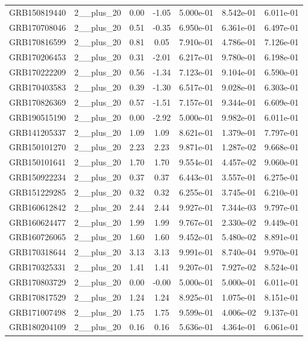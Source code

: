 \documentclass[12pt]{article}
\begin{document}
\begin{table}[h!]
{\begin{tabular}{l c c c c c c}
GRB150819440 & 2__plus_20 & 0.00 & -1.05 & 5.000e-01 & 8.542e-01 & 6.011e-01 \\
GRB170708046 & 2__plus_20 & 0.51 & -0.35 & 6.950e-01 & 6.361e-01 & 6.497e-01 \\
GRB170816599 & 2__plus_20 & 0.81 & 0.05 & 7.910e-01 & 4.786e-01 & 7.126e-01 \\
GRB170206453 & 2__plus_20 & 0.31 & -2.01 & 6.217e-01 & 9.780e-01 & 6.198e-01 \\
GRB170222209 & 2__plus_20 & 0.56 & -1.34 & 7.123e-01 & 9.104e-01 & 6.590e-01 \\
GRB170403583 & 2__plus_20 & 0.39 & -1.30 & 6.517e-01 & 9.028e-01 & 6.303e-01 \\
GRB170826369 & 2__plus_20 & 0.57 & -1.51 & 7.157e-01 & 9.344e-01 & 6.609e-01 \\
GRB190515190 & 2__plus_20 & 0.00 & -2.92 & 5.000e-01 & 9.982e-01 & 6.011e-01 \\
GRB141205337 & 2__plus_20 & 1.09 & 1.09 & 8.621e-01 & 1.379e-01 & 7.797e-01 \\
GRB150101270 & 2__plus_20 & 2.23 & 2.23 & 9.871e-01 & 1.287e-02 & 9.668e-01 \\
GRB150101641 & 2__plus_20 & 1.70 & 1.70 & 9.554e-01 & 4.457e-02 & 9.060e-01 \\
GRB150922234 & 2__plus_20 & 0.37 & 0.37 & 6.443e-01 & 3.557e-01 & 6.275e-01 \\
GRB151229285 & 2__plus_20 & 0.32 & 0.32 & 6.255e-01 & 3.745e-01 & 6.210e-01 \\
GRB160612842 & 2__plus_20 & 2.44 & 2.44 & 9.927e-01 & 7.344e-03 & 9.797e-01 \\
GRB160624477 & 2__plus_20 & 1.99 & 1.99 & 9.767e-01 & 2.330e-02 & 9.449e-01 \\
GRB160726065 & 2__plus_20 & 1.60 & 1.60 & 9.452e-01 & 5.480e-02 & 8.891e-01 \\
GRB170318644 & 2__plus_20 & 3.13 & 3.13 & 9.991e-01 & 8.740e-04 & 9.970e-01 \\
GRB170325331 & 2__plus_20 & 1.41 & 1.41 & 9.207e-01 & 7.927e-02 & 8.524e-01 \\
GRB170803729 & 2__plus_20 & 0.00 & -0.00 & 5.000e-01 & 5.000e-01 & 6.011e-01 \\
GRB170817529 & 2__plus_20 & 1.24 & 1.24 & 8.925e-01 & 1.075e-01 & 8.151e-01 \\
GRB171007498 & 2__plus_20 & 1.75 & 1.75 & 9.599e-01 & 4.006e-02 & 9.137e-01 \\
GRB180204109 & 2__plus_20 & 0.16 & 0.16 & 5.636e-01 & 4.364e-01 & 6.061e-01 \\

\end{tabular}}
\end{table}
\end{document}
